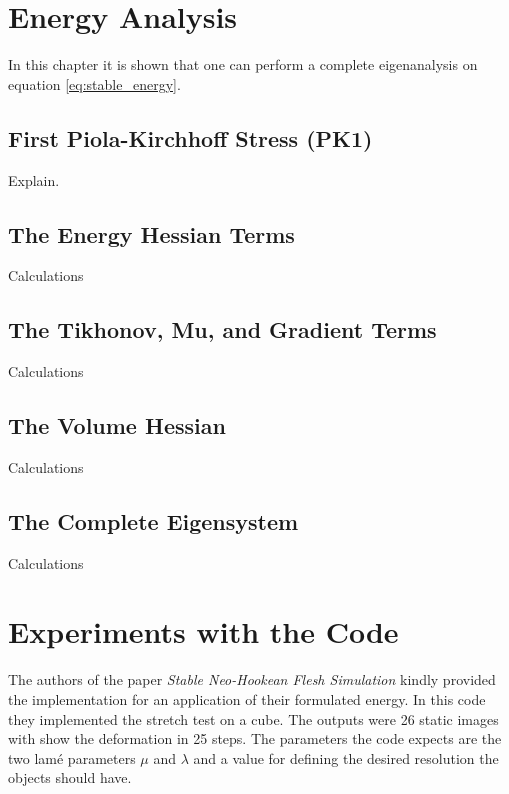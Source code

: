 \section{Energy Analysis}
In this chapter it is shown that one can perform a complete eigenanalysis on equation \ref{eq:stable_energy}.

\subsection{First Piola-Kirchhoff Stress (PK1)}
Explain.

\subsection{The Energy Hessian Terms}
Calculations

\subsection{The Tikhonov, Mu, and Gradient Terms}
Calculations

\subsection{The Volume Hessian}
Calculations
 
\subsection{The Complete Eigensystem}
Calculations






\section{Experiments with the Code}
The authors of the paper \textit{Stable Neo-Hookean Flesh Simulation} \cite{Smith:2018:SNF:3191713.3180491} kindly provided the implementation for an application of their formulated energy. In this code they implemented the stretch test on a cube. The outputs were 26 static images with show the deformation in 25 steps. The parameters the code expects are the two lamé parameters $\mu$ and $\lambda$ and a value for defining the desired resolution the objects should have.

